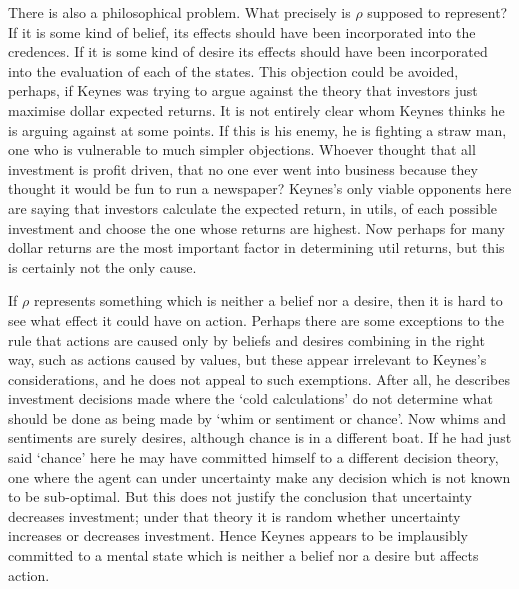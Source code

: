 There is also a philosophical problem. What precisely is \(\rho\) supposed to represent? If it is some kind of belief, its effects should have been incorporated into the credences. If it is some kind of desire its effects should have been incorporated into the evaluation of each of the states. This objection could be avoided, perhaps, if Keynes was trying to argue against the theory that investors just maximise dollar expected returns. It is not entirely clear whom Keynes thinks he is arguing against at some points. If this is his enemy, he is fighting a straw man, one who is vulnerable to much simpler objections. Whoever thought that all investment is profit driven, that no one ever went into business because they thought it would be fun to run a newspaper? Keynes's only viable opponents here are saying that investors calculate the expected return, in utils, of each possible investment and choose the one whose returns are highest. Now perhaps for many dollar returns are the most important factor in determining util returns, but this is certainly not the only cause.

If \(\rho\) represents something which is neither a belief nor a desire, then it is hard to see what effect it could have on action. Perhaps there are some exceptions to the rule that actions are caused only by beliefs and desires combining in the right way, such as actions caused by values, but these appear irrelevant to Keynes's considerations, and he does not appeal to such exemptions. After all, he describes investment decisions made where the `cold calculations' do not determine what should be done as being made by `whim or sentiment or chance'. Now whims and sentiments are surely desires, although chance is in a different boat. If he had just said `chance' here he may have committed himself to a different decision theory, one where the agent can under uncertainty make any decision which is not known to be sub-optimal. But this does not justify the conclusion that uncertainty decreases investment; under that theory it is random whether uncertainty increases or decreases investment. Hence Keynes appears to be implausibly committed to a mental state which is neither a belief nor a desire but affects action.

